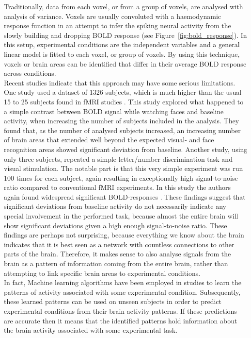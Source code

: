 \documentclass[preprint,journal,11pt]{vgtc}
\begin{document}
Traditionally, data from each voxel, or from a group of voxels, are analysed with analysis of variance. Voxels are usually convoluted with a haemodynamic response function in an attempt to infer the spiking neural activity from the slowly building and dropping BOLD response \cite{he:2002na} (see Figure~\ref{fig:bold_response}). In this setup, experimental conditions are the independent variables and a general linear model is fitted to each voxel, or group of voxels. By using this technique, voxels or brain areas can be identified that differ in their average BOLD response across conditions.\\
\indent Recent studies indicate that this approach may have some serious limitations. One study used a dataset of 1326 subjects, which is much higher than the usual 15 to 25 subjects found in fMRI studies \cite{thy:2012very}. This study explored what happened to a simple contrast between BOLD signal while watching faces and baseline activity, when increasing the number of subjects included in the analysis. They found that, as the number of analysed subjects increased, an increasing number of brain areas that extended well beyond the expected visual- and face recognition areas showed significant deviation from baseline. Another study, using only three subjects, repeated a simple letter/number discrimination task and visual stimulation. The notable part is that this very simple experiment was run 100 times for each subject, again resulting in exceptionally high signal-to-noise ratio compared to conventional fMRI experiments. In this study the authors again found widespread significant BOLD-responses \cite{go:2012whole}. These findings suggest that significant deviations from baseline activity do not necessarily indicate any special involvement in the performed task, because almost the entire brain will show significant deviations given a high enough signal-to-noise ratio. These findings are perhaps not surprising, because everything we know about the brain indicates that it is best seen as a network with countless connections to other parts of the brain. Therefore, it makes sense to also analyse signals from the brain as a pattern of information coming from the entire brain, rather than attempting to link specific brain areas to experimental conditions.\\
\indent In fact, Machine learning algorithms have been employed in studies to learn the patterns of activity associated with some experimental condition. Subsequently, these learned patterns can be used on unseen subjects in order to predict experimental conditions from their brain activity patterns. If these predictions are accurate then it means that the identified patterns hold information about the brain activity associated with some experimental task.\\
\end{document}
